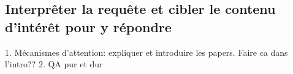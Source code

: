 \subsection{Interprêter la requête et cibler le contenu d'intérêt pour y répondre}
1. Mécanismes d’attention: expliquer et introduire les papers. Faire ca dans l’intro??
2. QA pur et dur
